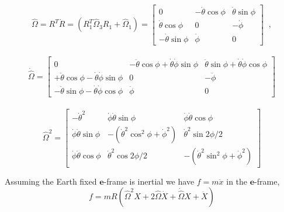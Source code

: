 \documentclass[graybox,envcountchap,sectrefs]{svmonoMuga}
\begin{document}
\[\widehat{\Omega}=R^T\dot{R}=(R_1^T\widehat{\Omega}_3R_1+\widehat{\Omega}_1)=\begin{bmatrix}
0& -\dot{\theta}\cos\phi & \dot{\theta}\sin\phi \\
\dot{\theta}\cos\phi & 0 & -\dot{\phi}\\
-\dot{\theta}\sin\phi &\dot{\phi} & 0
\end{bmatrix} \;\;,\]\\

\[\dot{\widehat{\Omega}}=\begin{bmatrix}
0 & -\ddot{\theta}\cos\phi+\dot{\theta}\dot{\phi}\sin\phi & \ddot{\theta}\sin\phi + \dot{\theta}\dot{\phi}\cos\phi \\
+\ddot{\theta}\cos\phi-\dot{\theta}\dot{\phi}\sin\phi & 0 & -\ddot{\phi}\\
-\ddot{\theta}\sin\phi - \dot{\theta}\dot{\phi}\cos\phi & \ddot{\phi} & 0
\end{bmatrix}
\]\\
\[
\widehat{\Omega}^2=\begin{bmatrix}-\dot{\theta}^2 &  \dot{\phi}\dot{\theta}\sin{\phi} & \dot{\phi}\dot{\theta}\cos{\phi}\\
\dot{\phi}\dot{\theta}\sin{\phi} & - (\dot{\theta}^2\cos^2{\phi} +\dot{\phi}^2) &       \dot{\theta}^2\sin{2\phi}/2\\
\dot{\phi}\dot{\theta}\cos{\phi} & \dot{\theta}^2\cos{2\phi}/2 & - (\dot{\theta}^2\sin^2{\phi} +\dot{\phi}^2)\end{bmatrix}
\]

Assuming the Earth fixed $\mathbf{e}$-frame is inertial we have $f=m\ddot{x}$ in the $\mathbf{e}$-frame,
\begin{equation}
f=mR\left(\widehat{\Omega}^2X+2\widehat{\Omega}\dot{X}+\dot{\widehat{\Omega}}X+\ddot{X} \right) \label{eq:f=ma}
\end{equation}
\end{document}
